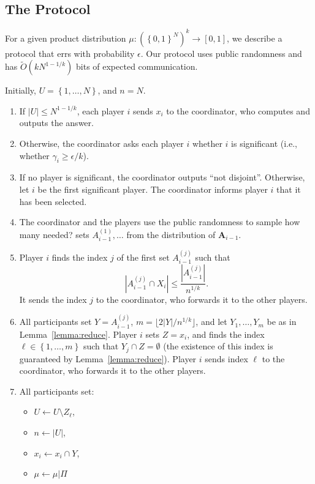 \documentclass{article}
\newcommand{\set}[1]{\left\{#1\right\}}
\newcommand{\eps}{\epsilon}
\newcommand{\TODO}[1]{ {\color{red} #1 }}
\newcommand{\rv}[1]{\mathbf{#1}}
\theoremstyle{plain}
\begin{document}
\subsection{The Protocol}
For a given product distribution $\mu : \left(\set{0,1}^N\right)^k \rightarrow [0,1]$, we describe a protocol that errs with probability $\epsilon$.
Our protocol uses public randomness and has $\tilde{O}(kN^{1-1/k})$ bits of expected communication.

Initially, $U = \set{1,\ldots,N}$, and $n = N$.
\begin{enumerate}[(1)]
  \item If $|U| \leq N^{1 - 1/k}$, each player $i$ sends $x_i$ to the coordinator, who computes and outputs the answer.
  \item Otherwise, the coordinator asks each player $i$ whether $i$ is significant (i.e., whether $\gamma_i \geq \eps / k$).
  \item If no player is significant, the coordinator outputs ``not disjoint''. Otherwise, let $i$ be the
    first significant player. The coordinator informs player $i$ that it has been selected.
  \item The coordinator and the players use the public randomness to sample \TODO{how many needed?}
    sets $A_{i-1}^{(1)},\ldots$ from the distribution of $\rv{A}_{i-1}$.
  \item Player $i$ finds the index $j$ of the first set $A_{i-1}^{(j)}$ such that
    \begin{equation*}
      |A_{i-1}^{(j)} \cap X_i| \leq \frac{|A_{i-1}^{(j)}|}{n^{1/k}}.
    \end{equation*}
    It sends the index $j$ to the coordinator, who forwards it to the other players.
  \item All participants set $Y = A_{i-1}^{(j)}$, $m = \lfloor 2|Y| / n^{1/k} \rfloor$,
    and let $Y_1,\ldots,Y_m$ be as in Lemma~\ref{lemma:reduce}.
    Player $i$ sets $Z = x_i$, and finds the index $\ell \in \set{1,\ldots,m}$
    such that $Y_j \cap Z = \emptyset$ (the existence of this index is guaranteed by Lemma~\ref{lemma:reduce}).
    Player $i$ sends index $\ell$ to the coordinator, who forwards it to the other players.
  \item All participants set:
    \begin{itemize}
      \item $U \leftarrow U \setminus Z_{\ell}$,
      \item $n \leftarrow |U|$,
      \item $x_i \leftarrow x_i \cap Y$,
      \item $\mu \leftarrow \mu | \Pi$
    \end{itemize}
\end{enumerate}
\end{document}
